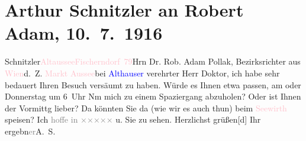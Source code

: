 

               \section[Arthur Schnitzler an Robert Adam, 10. 7. 1916]{ Arthur Schnitzler an Robert Adam, 10. 7. 1916}\nopagebreak{}\rehead{ }\normalsize\beginnumbering{} \toendnotes[C]{\smallbreak\pagebreak[2]} 
\toendnotes[C]{\smallbreak}\pstart{}{\pb}Schnitzler\pend{}\pstart{}\textcolor{pink}{Altaussee}{}\ledrightnote{\textcolor{pink}{Altaussee}}\pend{}\pstart{}\textcolor{pink}{Fischerndorf 79}{}\ledrightnote{\textcolor{pink}{Fischerndorf}}\pend{}{\bigskip}\pstart{}Hrn Dr. Rob. Adam Pollak, Bezirksrichter aus \textcolor{pink}{Wien}{}\ledrightnote{\textcolor{pink}{Wien}}\pend{}\pstart{}d. Z. \textcolor{pink}{Markt Aussee}{}\ledrightnote{\textcolor{pink}{Bad Aussee}}\pend{}\pstart{}bei \textcolor{blue}{Althauser}{}\ledrightnote{\textcolor{blue}{Althauser}}\pend{}{\bigskip}\pstart
           \noindent{}{\pb}verehrter Herr Doktor, ich habe sehr bedauert Ihren Besuch
                    versäumt zu haben. Würde es Ihnen etwa passen, am \label{K_L02230_1v}\label{K_L02230_1h} oder Donnerstag um 6 Uhr Nm mich zu einem
                    Spaziergang abzuholen? Oder ist Ihnen der Vormittg lieber? Da könnten Sie da{\geminationn} (wie wir es auch thun) beim \textcolor{pink}{Seewirth}{}\ledrightnote{\textcolor{pink}{Seewirt}} speisen? Ich \textcolor{gray}{hoffe in }{ }\textcolor{gray}{×}\-\textcolor{gray}{×}\-\textcolor{gray}{×}\-\textcolor{gray}{×}\-\textcolor{gray}{×} u. Sie zu sehen. Herzlichst
                        grüßen{[}d{]} Ihr ergebn\textcolor{gray}{er}\spacefill\mbox{A. S.}\pend
           \endnumbering{}  
      